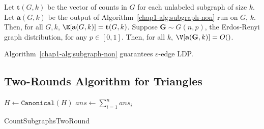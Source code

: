 \begin{theorem}\label{chap1-thm:rr-algo}
  Let $\textbf{t}(G, k)$ be the vector of counts in $G$ for each unlabeled subgraph of
  size $k$. Let $\textbf{a}(G,k)$ be the output of Algorithm~\ref{chap1-alg:subgraph-non} 
  run on $G$, $k$. 
  Then, for all $G,k$, $\E[\textbf{a}(G,k)] = \textbf{t}(G,k)$.
  Suppose $\textbf{G} \sim G(n,p)$, the Erdos-Renyi graph distribution, for any
  $p \in [0,1]$. Then, for all $k$, $\V[\textbf{a}(\textbf{G}, k)] = O()$.
\end{theorem}

\begin{theorem}
  Algorithm~\ref{chap1-alg:subgraph-non} guarantees $\varepsilon$-edge LDP.
\end{theorem}
\subsection{Two-Rounds Algorithm for Triangles}
\label{chap1-sub:two_rounds}
\begin{algorithm}
  \SetAlgoLined
  $H \leftarrow \texttt{Canonical}(H)$\;
  $ans \leftarrow \sum_{i=1}^n ans_i$\;
  \caption{CountSubgraphsTwoRound}
\end{algorithm}
